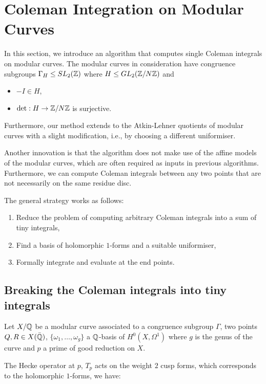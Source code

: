 \chapter{Coleman Integration on Modular Curves}

In this section, we introduce an algorithm that computes single Coleman integrals on modular curves. The modular curves in consideration have congruence subgroups $\Gamma_H \leq SL_2(\mathbb{Z})$ where $H \leq GL_2(\mathbb{Z}/N\mathbb{Z})$ and

\begin{itemize}
    \item $-I \in H$,
    \item $\det: H \rightarrow \mathbb{Z}/N\mathbb{Z}$ is surjective.
\end{itemize}

Furthermore, our method extends to the Atkin-Lehner quotients of modular curves with a slight modification, i.e., by choosing a different uniformiser.

Another innovation is that the algorithm does not make use of the affine models of the modular curves, which are often required as inputs in previous algorithms. Furthermore, we can compute Coleman integrals between any two points that are not necessarily on the same residue disc. 


The general strategy works as follows:

\begin{enumerate}
    \item Reduce the problem of computing arbitrary Coleman integrals into a sum of tiny integrals,
    \item Find a basis of holomorphic $1$-forms and a suitable uniformiser,
    \item Formally integrate and evaluate at the end points.
\end{enumerate}


\section{Breaking the Coleman integrals into tiny integrals}

Let $X/\mathbb{Q}$ be a modular curve associated to a congruence subgroup $\Gamma$, two points $Q,R \in X(\bar{\mathbb{Q}})$, $\{\omega_1, \ldots, \omega_g\}$ a $\mathbb{Q}$-basis of $H^0(X,\Omega^1)$ where $g$ is the genus of the curve and $p$ a prime of good reduction on $X$.

The Hecke operator at $p$, $T_p$ acts on the weight $2$ cusp forms, which corresponds to the holomorphic $1$-forms, we have:

